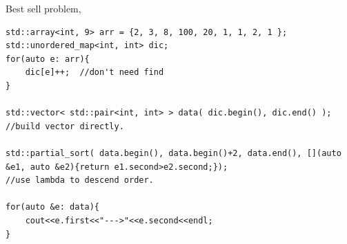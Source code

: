 \documentclass[a4paper,11pt,twoside]{book}
\begin{document}
%
%
%	
%	
%
%

	\par Best sell problem, 

\begin{lstlisting}
std::array<int, 9> arr = {2, 3, 8, 100, 20, 1, 1, 2, 1 };
std::unordered_map<int, int> dic;
for(auto e: arr){
	dic[e]++;  //don't need find
}

std::vector< std::pair<int, int> > data( dic.begin(), dic.end() );  //build vector directly.

std::partial_sort( data.begin(), data.begin()+2, data.end(), [](auto &e1, auto &e2){return e1.second>e2.second;}); 
//use lambda to descend order. 

for(auto &e: data){
	cout<<e.first<<"--->"<<e.second<<endl;
}		
\end{lstlisting}
\end{document}
